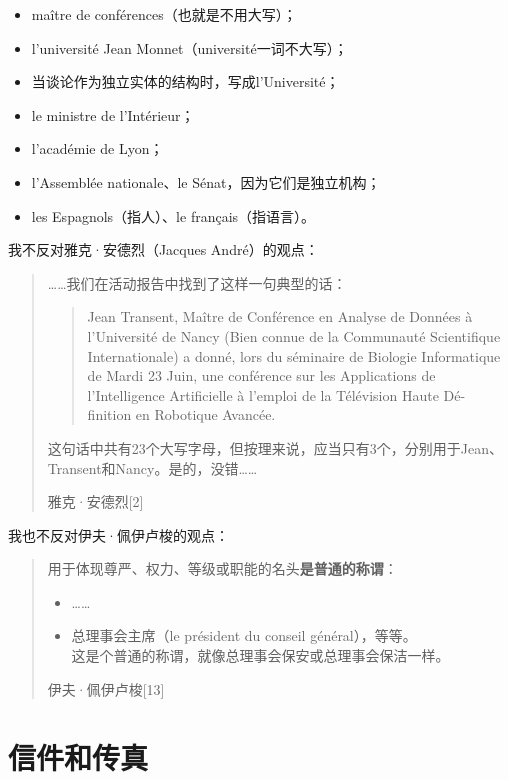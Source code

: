 \begin{itemize}
    \item maître de conférences（也就是不用大写）；
    \item l'université Jean Monnet（université一词不大写）；
    \item 当谈论作为独立实体的结构时，写成l'Université；
    \item le ministre de l'Intérieur；
    \item l'académie de Lyon；
    \item l'Assemblée nationale、le Sénat，因为它们是独立机构；
    \item les Espagnols（指人）、le français（指语言）。
\end{itemize}

我不反对雅克·安德烈（Jacques André）的观点：

\begin{quote}
    ……我们在活动报告中找到了这样一句典型的话：
    
    \begin{quote}
        Jean Transent, Maître de Conférence en Analyse de Données à l'Université de Nancy (Bien connue de la Communauté Scientifique Internationale) a donné, lors du séminaire de Biologie Informatique de Mardi 23 Juin, une conférence sur les Applications de l'Intelligence Artificielle à l'emploi de la Télévision Haute Dé- finition en Robotique Avancée.
    \end{quote}

    这句话中共有23个大写字母，但按理来说，应当只有3个，分别用于Jean、Transent和Nancy。是的，没错……
    
    \hfill 雅克·安德烈[2]
\end{quote}

我也不反对伊夫·佩伊卢梭的观点：

\begin{quote}
    用于体现尊严、权力、等级或职能的名头\textbf{是普通的称谓}：
    \begin{itemize}
        \item ……
        \item 总理事会主席（le président du conseil général），等等。\\\textsf{这是个普通的称谓，就像总理事会保安或总理事会保洁一样。}
    \end{itemize}

    \hfill 伊夫·佩伊卢梭[13]
\end{quote}

\section{信件和传真}

